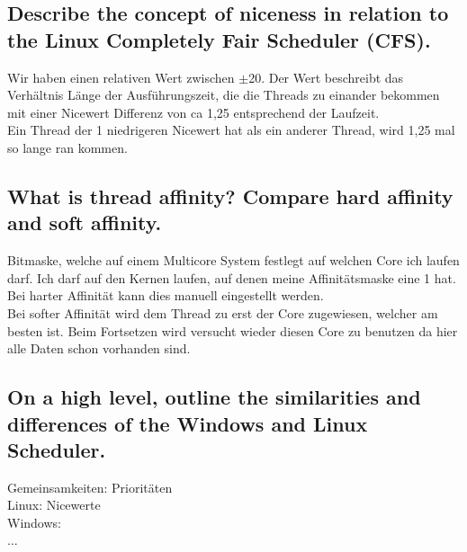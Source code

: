 \subsection{Describe the concept of niceness in relation to the Linux Completely Fair Scheduler (CFS).}
Wir haben einen relativen Wert zwischen $\pm$20. Der Wert beschreibt das Verh\"altnis L\"ange der Ausf\"uhrungszeit, die die Threads zu einander bekommen mit einer Nicewert Differenz von ca 1,25 entsprechend der Laufzeit.\\Ein Thread der 1 niedrigeren Nicewert hat als ein anderer Thread, wird 1,25 mal so lange ran kommen.

\subsection{What is thread affinity? Compare hard affinity and soft affinity.}
Bitmaske, welche auf einem Multicore System festlegt auf welchen Core ich laufen darf. Ich darf auf den Kernen laufen, auf denen meine Affinit\"atsmaske eine 1 hat.\\
Bei harter Affinit\"at kann dies manuell eingestellt werden.\\
Bei softer Affinit\"at wird dem Thread zu erst der Core zugewiesen, welcher am besten ist. Beim Fortsetzen wird versucht wieder diesen Core zu benutzen da hier alle Daten schon vorhanden sind.

\subsection{On a high level, outline the similarities and differences of the Windows and Linux Scheduler.}
Gemeinsamkeiten: Priorit\"aten\\
Linux: Nicewerte\\
Windows: \\
$\dots$\\
\missing